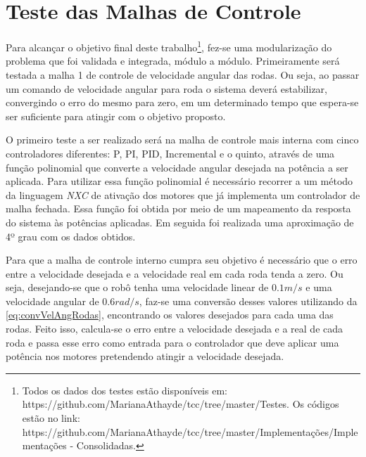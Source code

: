 \chapter{Teste das Malhas de Controle}
\label{chap:testesMalhas}
Para alcançar o objetivo final deste trabalho\footnote{Todos os dados dos testes estão disponíveis em: https://github.com/MarianaAthayde/tcc/tree/master/Testes. Os códigos estão no link: https://github.com/MarianaAthayde/tcc/tree/master/Implementações/Implementações - Consolidadas.}, fez-se uma modularização do problema que foi validada e integrada, módulo a módulo. Primeiramente será testada a malha 1 de controle de velocidade angular das rodas. %
Ou seja, ao passar um comando de velocidade angular para roda o sistema deverá estabilizar, convergindo o erro do mesmo para zero, em um determinado tempo que espera-se ser suficiente para atingir com o objetivo proposto.

O primeiro teste a ser realizado será na malha de controle mais interna com cinco controladores diferentes: P, PI, PID, Incremental e o quinto, através de uma função polinomial que converte a velocidade angular desejada na potência a ser aplicada. Para utilizar essa função polinomial é necessário recorrer a um método da linguagem \emph{NXC} de ativação dos motores que já implementa um controlador de malha fechada. Essa função foi obtida por meio de um mapeamento da resposta do sistema às potências aplicadas. Em seguida foi realizada uma aproximação de 4º grau com os dados obtidos.

Para que a malha de controle interno cumpra seu objetivo é necessário que o erro entre a velocidade desejada e a velocidade real em cada roda tenda a zero. Ou seja, desejando-se que o robô tenha uma velocidade linear de $0.1 m/s$ e uma velocidade angular de $0.6 rad/s$, faz-se uma conversão desses valores utilizando da \autoref{eq:convVelAngRodas}, encontrando os valores desejados para cada uma das rodas. Feito isso, calcula-se o erro entre a velocidade desejada e a real de cada roda e passa esse erro como entrada para o controlador que deve aplicar uma potência nos motores pretendendo atingir a velocidade desejada.

